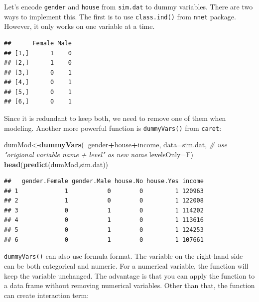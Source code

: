 \documentclass[12pt,]{krantz}
\newenvironment{Shaded}{\begin{snugshade}}{\end{snugshade}}
\newcommand{\KeywordTok}[1]{\textcolor[rgb]{0.13,0.29,0.53}{\textbf{#1}}}
\newcommand{\DataTypeTok}[1]{\textcolor[rgb]{0.13,0.29,0.53}{#1}}
\newcommand{\CommentTok}[1]{\textcolor[rgb]{0.56,0.35,0.01}{\textit{#1}}}
\newcommand{\OperatorTok}[1]{\textcolor[rgb]{0.81,0.36,0.00}{\textbf{#1}}}
\newcommand{\NormalTok}[1]{#1}
\theoremstyle{definition}
\theoremstyle{definition}
\theoremstyle{definition}
\theoremstyle{remark}
\begin{document}
Let's encode \texttt{gender} and \texttt{house} from \texttt{sim.dat} to
dummy variables. There are two ways to implement this. The first is to
use \texttt{class.ind()} from \texttt{nnet} package. However, it only
works on one variable at a time.

\begin{Shaded}
\end{Shaded}

\begin{verbatim}
##      Female Male
## [1,]      1    0
## [2,]      1    0
## [3,]      0    1
## [4,]      0    1
## [5,]      0    1
## [6,]      0    1
\end{verbatim}

Since it is redundant to keep both, we need to remove one of them when
modeling. Another more powerful function is \texttt{dummyVars()} from
\texttt{caret}:

\begin{Shaded}
\begin{Highlighting}[]
\NormalTok{dumMod<-}\KeywordTok{dummyVars}\NormalTok{(}\OperatorTok{~}\NormalTok{gender}\OperatorTok{+}\NormalTok{house}\OperatorTok{+}\NormalTok{income,}
                  \DataTypeTok{data=}\NormalTok{sim.dat,}
                  \CommentTok{# use "origional variable name + level" as new name}
                  \DataTypeTok{levelsOnly=}\NormalTok{F)}
\KeywordTok{head}\NormalTok{(}\KeywordTok{predict}\NormalTok{(dumMod,sim.dat))}
\end{Highlighting}
\end{Shaded}

\begin{verbatim}
##   gender.Female gender.Male house.No house.Yes income
## 1             1           0        0         1 120963
## 2             1           0        0         1 122008
## 3             0           1        0         1 114202
## 4             0           1        0         1 113616
## 5             0           1        0         1 124253
## 6             0           1        0         1 107661
\end{verbatim}

\texttt{dummyVars()} can also use formula format. The variable on the
right-hand side can be both categorical and numeric. For a numerical
variable, the function will keep the variable unchanged. The advantage
is that you can apply the function to a data frame without removing
numerical variables. Other than that, the function can create
interaction term:
\end{document}
